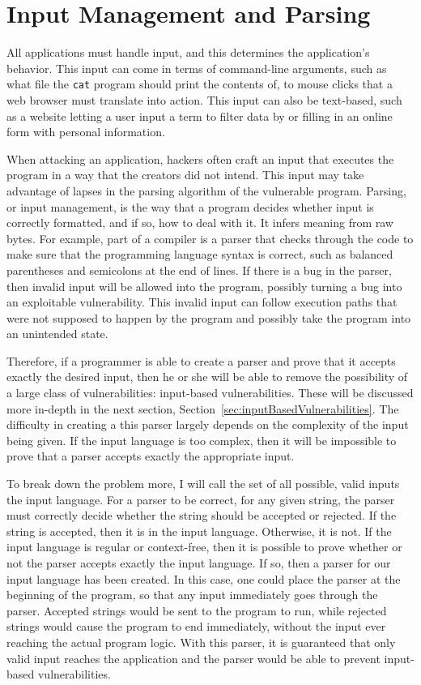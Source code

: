 \section{Input Management and Parsing}
\label{sec:inputManagement}
All applications must handle input, and this determines the application's behavior.  This input can come in terms of command-line arguments, such as what file the \texttt{cat} program should print the contents of, to mouse clicks that a web browser must translate into action.  This input can also be text-based, such as a website letting a user input a term to filter data by or filling in an online form with personal information.

When attacking an application, hackers often craft an input that executes the program in a way that the creators did not intend.  This input may take advantage of lapses in the parsing algorithm of the vulnerable program.  Parsing, or input management, is the way that a program decides whether input is correctly formatted, and if so, how to deal with it.  It infers meaning from raw bytes.  For example, part of a compiler is a parser that checks through the code to make sure that the programming language syntax is correct, such as balanced parentheses and semicolons at the end of lines.  If there is a bug in the parser, then invalid input will be allowed into the program, possibly turning a bug into an exploitable vulnerability.  This invalid input can follow execution paths that were not supposed to happen by the program and possibly take the program into an unintended state.

Therefore, if a programmer is able to create a parser and prove that it accepts exactly the desired input, then he or she will be able to remove the possibility of a large class of vulnerabilities: input-based vulnerabilities.  These will be discussed more in-depth in the next section, Section~\ref{sec:inputBasedVulnerabilities}.  The difficulty in creating a this parser largely depends on the complexity of the input being given.  If the input language is too complex, then it will be impossible to prove that a parser accepts exactly the appropriate input.

To break down the problem more, I will call the set of all possible, valid inputs the input language.  For a parser to be correct, for any given string, the parser must correctly decide whether the string should be accepted or rejected.  If the string is accepted, then it is in the input language.  Otherwise, it is not.  If the input language is regular or context-free, then it is possible to prove whether or not the parser accepts exactly the input language.  If so, then a parser for our input language has been created.  In this case, one could place the parser at the beginning of the program, so that any input immediately goes through the parser.  Accepted strings would be sent to the program to run, while rejected strings would cause the program to end immediately, without the input ever reaching the actual program logic.  With this parser, it is guaranteed that only valid input reaches the application and the parser would be able to prevent input-based vulnerabilities.

